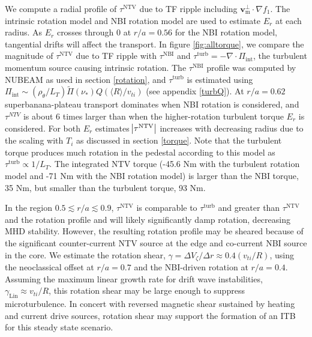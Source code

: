 \documentclass[aip, pop, preprint]{revtex4-1}
\begin{document}
\FloatBarrier
We compute a radial profile of $\tau^{\mathrm{NTV}}$ due to TF ripple including $\bm{v}_{\text{m}}^{\perp} \cdot \nabla f_1$. The intrinsic rotation model and NBI rotation model are used to estimate $E_r$ at each radius. As $E_r$ crosses through 0 at $r/a = 0.56$ for the NBI rotation model, tangential drifts will affect the transport. In figure \ref{fig:alltorque}, we compare the magnitude of $\tau^{\mathrm{NTV}}$ due to TF ripple with $\tau^{\mathrm{NBI}}$ and $\tau^{\mathrm{turb}} = -\nabla \cdot \Pi_{\mathrm{int}}$, the turbulent momentum source causing intrinsic rotation. The $\tau^{\mathrm{NBI}}$ profile was computed by NUBEAM as used in section \ref{rotation}, and $\tau^{\mathrm{turb}}$ is estimated using $\Pi_{\mathrm{int}} \sim (\rho_{\theta}/L_T) \widetilde{\Pi}(\nu_*) Q (\langle R \rangle/v_{ti})$ (see appendix \ref{turbQ}). At $r/a = 0.62$ superbanana-plateau transport dominates when NBI rotation is considered, and $\tau^{NTV}$ is about 6 times larger than when the higher-rotation turbulent torque $E_r$ is considered. For both $E_r$ estimates $\abs{\tau^{\text{NTV}}}$ increases with decreasing radius due to the scaling with $T_i$ as discussed in section \ref{torque}. Note that the turbulent torque produces much rotation in the pedestal according to this model as $\tau^{\mathrm{turb}} \propto 1/L_T$. The integrated NTV torque (-45.6 Nm with the turbulent rotation model and -71 Nm with the NBI rotation model) is larger than the NBI torque, 35 Nm, but smaller than the turbulent torque, 93 Nm. 

In the region $0.5 \lesssim r/a \lesssim 0.9$, $\tau^{\mathrm{NTV}}$ is comparable to $\tau^{\mathrm{turb}}$ and greater than $\tau^{\mathrm{NTV}}$ and the rotation profile and will likely significantly damp rotation, decreasing MHD stability. However, the resulting rotation profile may be sheared because of the significant counter-current NTV source at the edge and co-current NBI source in the core. We estimate the rotation shear, $\gamma = \Delta V_{\zeta}/ \Delta r \approx 0.4 (v_{ti}/R)$, using the neoclassical offset at $r/a = 0.7$ and the NBI-driven rotation at $r/a = 0.4$. Assuming the maximum linear growth rate for drift wave instabilities, $\gamma_{\mathrm{Lin}} \approx v_{ti}/R$,\cite{Connor2004} this rotation shear may be large enough to suppress microturbulence. In concert with reversed magnetic shear sustained by heating and current drive sources,\cite{Poli2014} rotation shear may support the formation of an ITB \cite{Waltz1994} for this steady state scenario. 
\end{document}
